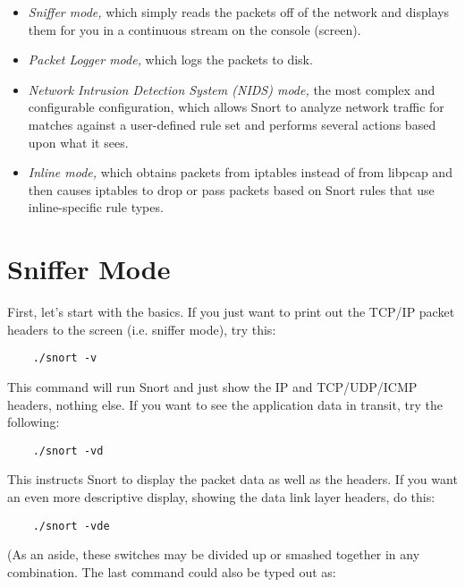 \documentclass[english]{report}
\begin{document}
\begin{itemize}

\item {\em Sniffer mode,} which simply reads the packets off of the network and
displays them for you in a continuous stream on the console (screen). 

\item {\em Packet Logger mode,} which logs the packets to disk. 

\item {\em Network Intrusion Detection System (NIDS) mode,} the most complex
and configurable configuration, which allows Snort to analyze network traffic
for matches against a user-defined rule set and performs several actions based
upon what it sees.

\item {\em Inline mode,} which obtains packets from iptables instead of from
libpcap and then causes iptables to drop or pass packets based on Snort rules
that use inline-specific rule types.

\end{itemize}

\section{Sniffer Mode}

First, let's start with the basics. If you just want to print out the TCP/IP
packet headers to the screen (i.e. sniffer mode), try this:

\begin{verbatim}
    ./snort -v
\end{verbatim}

This command will run Snort and just show the IP and TCP/UDP/ICMP headers,
nothing else. If you want to see the application data in transit, try the
following:

\begin{verbatim}
    ./snort -vd
\end{verbatim}

This instructs Snort to display the packet data as well as the headers.  If you
want an even more descriptive display, showing the data link layer headers, do
this:

\begin{verbatim}
    ./snort -vde
\end{verbatim}

(As an aside, these switches may be divided up or smashed together in any
combination. The last command could also be typed out as:
\end{document}
